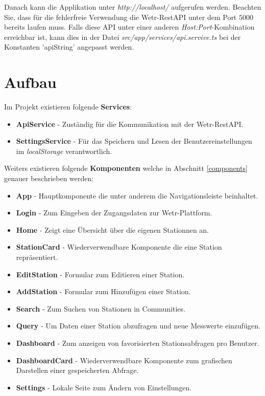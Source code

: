 \documentclass[12pt, letterpaper]{article}
\begin{document}
Danach kann die Applikation unter \textit{http://localhost/} aufgerufen werden.
Beachten Sie, dass für die fehlerfreie Verwendung die Wetr-RestAPI unter dem Port $5000$ bereits laufen muss. Falls diese API unter einer anderen \textit{Host:Port}-Kombination erreichbar ist, kann dies in der Datei \textit{src/app/services/api.servive.ts} bei der Konstanten 'apiString' angepasst werden.
\newpage

\section{Aufbau}

Im Projekt existieren folgende \textbf{Services}:
\begin{itemize}
    \item \textbf{ApiService} - Zuständig für die Kommunikation mit der Wetr-RestAPI.
    \item \textbf{SettingsService} - Für das Speichern und Lesen der Benutzereinstellungen im \textit{localStorage} verantwortlich.
\end{itemize}

Weiters existieren folgende \textbf{Komponenten} welche in Abschnitt \ref{components} genauer beschrieben werden:
\begin{itemize}
    \item \textbf{App} - Hauptkomponente die unter anderem die Navigationsleiste beinhaltet.
    \item \textbf{Login} - Zum Eingeben der Zugangsdaten zur Wetr-Plattform.
    \item \textbf{Home} - Zeigt eine Übersicht über die eigenen Stationnen an.
    \item \textbf{StationCard} - Wiederverwendbare Komponente die eine Station repräsentiert.
    \item \textbf{EditStation} - Formular zum Editieren einer Station.
    \item \textbf{AddStation} - Formular zum Hinzufügen einer Station.
    \item \textbf{Search} - Zum Suchen von Stationen in Communities.
    \item \textbf{Query} - Um Daten einer Station abzufragen und neue Messwerte einzufügen.
    \item \textbf{Dashboard} - Zum anzeigen von favorisierten Stationsabfragen pro Benutzer.
    \item \textbf{DashboardCard} - Wiederverwendbare Komponente zum grafischen Darstellen einer gespeicherten Abfrage.
    \item \textbf{Settings} - Lokale Seite zum Ändern von Einstellungen.

\end{itemize}
\end{document}
